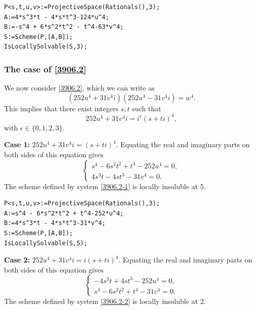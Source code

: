 \documentclass[a4paper,12pt,english,reqno]{amsart}
\begin{document}
\begin{lstlisting}
P<s,t,u,v>:=ProjectiveSpace(Rationals(),3);
A:=4*s^3*t - 4*s*t^3-124*u^4;
B:=-s^4 + 6*s^2*t^2 - t^4-63*v^4;
S:=Scheme(P,[A,B]);
IsLocallySolvable(S,3);
\end{lstlisting}



\subsubsection{\bf{The case of \eqref{3906.2}}} %
We now consider \eqref{3906.2}, which we can write as
\begin{equation} (252u^4+31v^4i)(252u^4-31v^4i)=w^4.
\end{equation}
This implies that there exist integers $s,t$ such that 
\[252u^4+31v^4i=i^{\epsilon}(s+ti)^4,\]
with $\epsilon \in \{0,1,2,3\}$.

{\bf Case 1:} $252u^4+31v^4i=(s+ti)^4$. Equating the real and imaginary parts on both sides of this equation gives
\begin{equation}\label{3906.2-1}
\begin{cases}
s^4 - 6s^2t^2 + t^4 - 252u^4=0,\\
4s^3t - 4st^3 - 31v^4=0.
\end{cases}
\end{equation}
The scheme defined by system \eqref{3906.2-1} is locally insoluble at $5$.

%
\begin{lstlisting}
P<s,t,u,v>:=ProjectiveSpace(Rationals(),3);
A:=s^4 - 6*s^2*t^2 + t^4-252*u^4;
B:=4*s^3*t - 4*s*t^3-31*v^4;
S:=Scheme(P,[A,B]);
IsLocallySolvable(S,5);
\end{lstlisting}


{\bf Case 2:} $252u^4+31v^4i=i(s+ti)^4$. Equating the real and imaginary parts on both sides of this equation gives
\begin{equation}\label{3906.2-2}
\begin{cases}
-4s^3t + 4st^3 - 252u^4=0,\\
s^4 - 6s^2t^2 + t^4 - 31v^4=0.
\end{cases}
\end{equation}
The scheme defined by system \eqref{3906.2-2} is locally insoluble at $2$.
\end{document}
